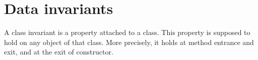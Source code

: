 \documentclass[a4paper,11pt,twoside,openright]{report}
\begin{document}
      






\section{Data invariants}


  A class invariant is a property attached to a class. This property
  is supposed to hold on any object of that class. More precisely, it
  holds at method entrance and exit, and at the exit of constructor.

\end{document}
